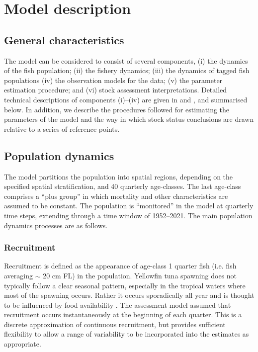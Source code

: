 
\section{Model description}
\label{sec:model_description]}

\subsection{General characteristics}

The model can be considered to consist of several components, (i) the dynamics of the fish population; (ii) the fishery dynamics; (iii) the dynamics of tagged fish populations (iv) the observation models for the data; (v) the parameter estimation procedure; and (vi) stock assessment interpretations. Detailed technical descriptions of components (i)--(iv) are given in \citet{hampton_spatially-disaggregated_2001} and \citet{kleiber_multifan-cl_2019}, and summarised below. In addition, we describe the procedures followed for estimating the parameters of the model and the way in which stock status conclusions are drawn relative to a series of reference points.

\subsection{Population dynamics}
\label{sec:model_population_dynamics}

The model partitions the population into spatial regions, depending on the specified spatial stratification, and 40 quarterly age-classes. The last age-class comprises a \enquote{plus group} in which mortality and other characteristics are assumed to be constant. The population is \enquote{monitored} in the model at quarterly time steps, extending through a time window of 1952--2021. The main population dynamics processes are as follows.

\subsubsection{Recruitment}
\label{sec:model_recruitment}

Recruitment is defined as the appearance of age-class 1 quarter fish (i.e. fish averaging $\sim$ 20 cm FL) in the population. Yellowfin tuna spawning does not typically follow a clear seasonal pattern, especially in the tropical waters where most of the spawning occurs. Rather it occurs sporadically all year and is thought to be influenced by food availability \citep{itano_reproductive_2000}. The assessment model assumed that recruitment occurs instantaneously at the beginning of each quarter. This is a discrete approximation of continuous recruitment, but provides sufficient flexibility to allow a range of variability to be incorporated into the estimates as appropriate.

